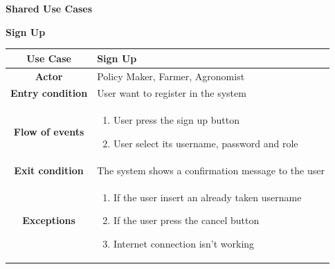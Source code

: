 \documentclass[table, 12pt]{article}
\begin{document}
        \begin{itemize}
            \item \textbf {Shared Use Cases}
            
            \begin{table}[H]
                \item[] \textbf{Sign Up}
                \item[] 
                \centering
                \begin{tabular}{|c |m{}|}
                    \hline
                    \textbf{Use Case} & Sign Up\\ \hline
                    \textbf{Actor} & Policy Maker, Farmer, Agronomist\\ \hline
                    \textbf{Entry condition} & User want to register in the system\\  \hline
                    \textbf{Flow of events} & \begin{enumerate}
                                                \item User press the sign up button
                                                \item User select its username, password and role
                                            \end{enumerate}\\ \hline
                    \textbf{Exit condition} & The system shows a confirmation message to the user \\ \hline
                    \textbf{Exceptions} &  \begin{enumerate}
                        \item If the user insert an already taken username
                        \item If the user press the cancel button
                        \item Internet connection isn't working
                    \end{enumerate}\\ \hline                    
                \end{tabular}
            \end{table}


\end{itemize}
\end{document}
